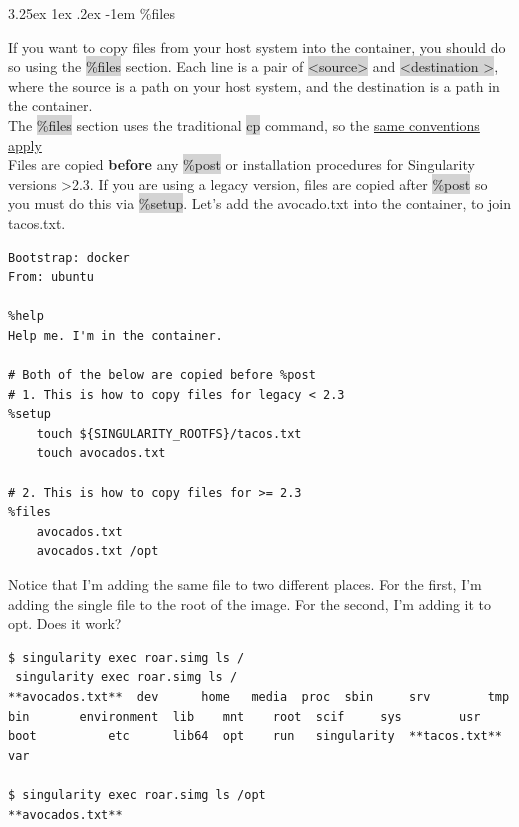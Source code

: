 \documentclass[a4paper]{article}
\makeatletter
\renewcommand\paragraph{\@startsection{paragraph}{5}{\z@}%
  {3.25ex \@plus1ex \@minus.2ex}%
  {-1em}%
  {\normalfont\normalsize\bfseries}}
\makeatother
\begin{document}
\paragraph{\%files}
		
If you want to copy files from your host system into the container, you should do so using the  \colorbox{lightgray}{\%files} section. Each line is a pair of  \colorbox{lightgray}{\textless source\textgreater}  and  \colorbox{lightgray}{\textless destination \textgreater}, where the source is a path on your host system, and the destination is a path in the container.\\[0.1in]

The \colorbox{lightgray}{\%files} section uses the traditional  \colorbox{lightgray}{cp} command, so the \href{https://linux.die.net/man/1/cp}{same conventions apply}\\[0.1in]

Files are copied \textbf{before} any \colorbox{lightgray}{\%post} or installation procedures for Singularity versions \textgreater 2.3. If you are using a legacy version, files are copied after \colorbox{lightgray}{\%post} so you must do this via \colorbox{lightgray}{\%setup}. Let’s add the avocado.txt into the container, to join tacos.txt.\\[0.1in]

\begin{lstlisting}[frame=single] 
Bootstrap: docker
From: ubuntu

%help
Help me. I'm in the container.

# Both of the below are copied before %post
# 1. This is how to copy files for legacy < 2.3
%setup
    touch ${SINGULARITY_ROOTFS}/tacos.txt
    touch avocados.txt

# 2. This is how to copy files for >= 2.3
%files
    avocados.txt
    avocados.txt /opt 
\end{lstlisting}

Notice that I’m adding the same file to two different places. For the first, I’m adding the single file to the root of the image. For the second, I’m adding it to opt. Does it work?

\begin{lstlisting}[frame=single] 
$ singularity exec roar.simg ls /
 singularity exec roar.simg ls /
**avocados.txt**  dev	   home   media  proc  sbin	    srv        tmp
bin	      environment  lib	  mnt	 root  scif	    sys        usr
boot	      etc	   lib64  opt	 run   singularity  **tacos.txt**  var

$ singularity exec roar.simg ls /opt
**avocados.txt**
 
\end{lstlisting}
\end{document}
